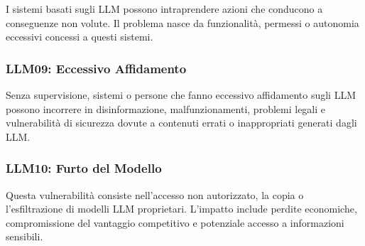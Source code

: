 \documentclass[
]{article}
\begin{document}
I sistemi basati sugli LLM possono intraprendere azioni che conducono a
conseguenze non volute. Il problema nasce da funzionalità, permessi o
autonomia eccessivi concessi a questi sistemi.

\subsubsection{LLM09: Eccessivo
Affidamento}\label{llm09-eccessivo-affidamento}

Senza supervisione, sistemi o persone che fanno eccessivo affidamento
sugli LLM possono incorrere in disinformazione, malfunzionamenti,
problemi legali e vulnerabilità di sicurezza dovute a contenuti errati o
inappropriati generati dagli LLM.

\subsubsection{LLM10: Furto del Modello}\label{llm10-furto-del-modello}

Questa vulnerabilità consiste nell'accesso non autorizzato, la copia o
l'esfiltrazione di modelli LLM proprietari. L'impatto include perdite
economiche, compromissione del vantaggio competitivo e potenziale
accesso a informazioni sensibili.
\end{document}
